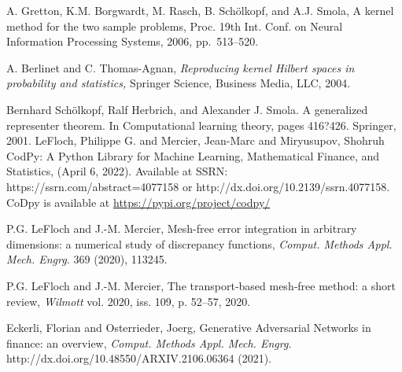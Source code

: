 \documentclass[
]{article}
\numberwithin{equation}{section}
\begin{document}
\begin{thebibliography}{00}

{\sc A. Gretton, K.M. Borgwardt, M. Rasch, B. Sch\"{o}lkopf, and A.J. Smola,}
A kernel method for the two sample problems,
Proc. 19th Int. Conf. on Neural Information Processing Systems, 2006, pp.~513--520.

{\sc A. Berlinet and C. Thomas-Agnan,}
{\it Reproducing kernel Hilbert spaces in probability and statistics,}
Springer Science, Business Media, LLC, 2004.

 Bernhard Sch\"{o}lkopf, Ralf Herbrich, and Alexander J. Smola. A generalized representer theorem. In Computational learning theory, pages 416?426. Springer, 2001.
{\sc LeFloch, Philippe G. and Mercier, Jean-Marc and Miryusupov, Shohruh}
CodPy: A Python Library for Machine Learning, Mathematical Finance, and Statistics,  (April 6, 2022). Available at SSRN: https://ssrn.com/abstract=4077158 or http://dx.doi.org/10.2139/ssrn.4077158. CoDpy is available at
\url{https://pypi.org/project/codpy/}


{\sc P.G. LeFloch and J.-M. Mercier,}
Mesh-free error integration in arbitrary dimensions: a numerical study of discrepancy functions,
{\it Comput. Methods Appl. Mech. Engrg.} 369 (2020), 113245.

{\sc P.G. LeFloch and J.-M. Mercier,}
The transport‐based mesh‐free method: a short review,
{\it Wilmott} vol. 2020, iss. 109, p. 52–57, 2020.


{\sc Eckerli, Florian and Osterrieder, Joerg,}
Generative Adversarial Networks in finance: an overview,
{\it Comput. Methods Appl. Mech. Engrg.} http://dx.doi.org/10.48550/ARXIV.2106.06364 (2021).

\end{thebibliography}
\end{document}
